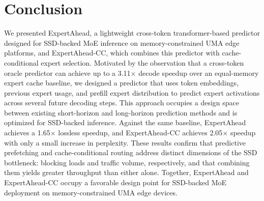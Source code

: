 \section{Conclusion}
 We presented ExpertAhead, a lightweight cross-token transformer-based predictor designed for SSD-backed MoE inference on memory-constrained UMA edge platforms, and ExpertAhead-CC, which combines this predictor with cache-conditional expert selection. Motivated by the observation that a cross-token oracle predictor can achieve up to a 3.11$\times$ decode speedup over an equal-memory expert cache baseline, we designed a predictor that uses token embeddings, previous expert usage, and prefill expert distribution to predict expert activations across several future decoding steps. This approach occupies a design space between existing short-horizon and long-horizon prediction methods and is optimized for SSD-backed inference.  Against the same baseline, ExpertAhead achieves a 1.65$\times$ lossless speedup, and ExpertAhead-CC achieves 2.05$\times$ speedup with only a small increase in perplexity. These results confirm that predictive prefetching and cache-conditional routing address distinct dimensions of the SSD bottleneck: blocking loads and traffic volume, respectively, and that combining them yields greater throughput than either alone.  Together, ExpertAhead and ExpertAhead-CC occupy a favorable design point for SSD-backed MoE deployment on memory-constrained UMA edge devices.

